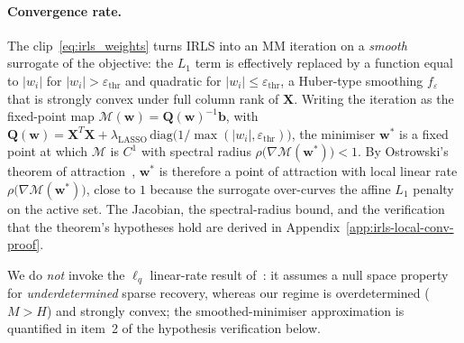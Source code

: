 \paragraph{Convergence rate.}
The clip~\eqref{eq:irls_weights} turns IRLS into an MM iteration on a \emph{smooth} surrogate of the objective: the $L_1$ term is effectively replaced by a function equal to $|w_i|$ for $|w_i| > \varepsilon_{\mathrm{thr}}$ and quadratic for $|w_i| \le \varepsilon_{\mathrm{thr}}$, a Huber-type smoothing $f_\varepsilon$ that is strongly convex under full column rank of $\mathbf{X}$. Writing the iteration as the fixed-point map $\mathcal{M}(\mathbf{w}) = \mathbf{Q}(\mathbf{w})^{-1}\mathbf{b}$, with $\mathbf{Q}(\mathbf{w}) = \mathbf{X}^T\mathbf{X} + \lambda_{\text{LASSO}}\,\mathrm{diag}\!\big(1/\max(|w_i|,\varepsilon_{\mathrm{thr}})\big)$, the minimiser $\mathbf{w}^*$ is a fixed point at which $\mathcal{M}$ is $C^1$ with spectral radius $\rho\big(\nabla\mathcal{M}(\mathbf{w}^*)\big) < 1$. By Ostrowski's theorem of attraction~\cite{ortega1970iterative}, $\mathbf{w}^*$ is therefore a point of attraction with local linear rate $\rho\big(\nabla\mathcal{M}(\mathbf{w}^*)\big)$, close to $1$ because the surrogate over-curves the affine $L_1$ penalty on the active set. The Jacobian, the spectral-radius bound, and the verification that the theorem's hypotheses hold are derived in Appendix~\ref{app:irls-local-conv-proof}.

We do \emph{not} invoke the $\ell_q$ linear-rate result of~\cite[Theorem~5.3]{daubechies2008iterativelyreweightedsquaresminimization}: it assumes a null space property for \emph{underdetermined} sparse recovery, whereas our regime is overdetermined ($M > H$) and strongly convex; the smoothed-minimiser approximation is quantified in item~2 of the hypothesis verification below.

